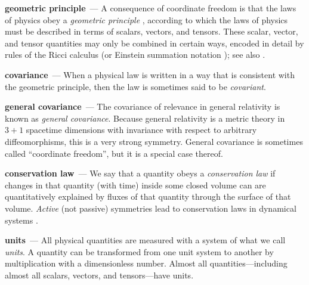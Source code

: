 \documentclass[11pt]{article}
\renewcommand{\paragraph}[1]{\medskip\par\noindent\textbf{#1}~---}
\begin{document}
\paragraph{geometric principle}
A consequence of coordinate freedom is that the laws of physics obey a \emph{geometric principle} \cite{mcp}, according to which the laws of physics must be described in terms of scalars, vectors, and tensors.
These scalar, vector, and tensor quantities may only be combined in certain ways, encoded in detail by rules of the Ricci calculus \cite{ricci} (or Einstein summation notation \cite{einstein}); see also \cite{villar2021scalars}.

\paragraph{covariance}
When a physical law is written in a way that is consistent with the geometric principle, then the law is sometimes said to be \emph{covariant}.

\paragraph{general covariance}
The covariance of relevance in general relativity \cite{einstein} is known as \emph{general covariance}.
Because general relativity is a metric theory in $3+1$ spacetime dimensions with invariance with respect to arbitrary diffeomorphisms, this is a very strong symmetry.
General covariance is sometimes called ``coordinate freedom'', but it is a special case thereof.

\paragraph{conservation law}
We say that a quantity obeys a \emph{conservation law} if changes in that quantity (with time) inside some closed volume can are quantitatively explained by fluxes of that quantity through the surface of that volume.
\emph{Active} (not passive) symmetries lead to conservation laws in dynamical systems \cite{noether}.

\paragraph{units}
All physical quantities are measured with a system of what we call \emph{units}.
A quantity can be transformed from one unit system to another by multiplication with a dimensionless number.
Almost all quantities---including almost all scalars, vectors, and tensors---have units.
\end{document}
